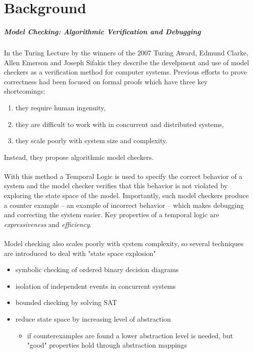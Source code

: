 \documentclass{uit-thesis}
\begin{document}
\chapter{Background}\label{ch:background}
\paragraph{Model Checking: Algorithmic Verification and Debugging~\cite{Clarke2009}}
In the Turing Lecture by the winners of the 2007 Turing Award, Edmund Clarke, Allen Emerson and Joseph Sifakis they describe the develpment and use of model checkers as a verification method for computer systems. Previous efforts to prove correctness had been focused on formal proofs which have three key shortcomings:
\begin{enumerate}
    \item they require human ingenuity,
    \item they are difficult to work with in concurrent and distributed systems,
    \item they scale poorly with system size and complexity.
\end{enumerate}
Instead, they propose algorithmic model checkers.
\\\\
With this method a Temporal Logic is used to specify the correct behavior of a system and the model checker verifies that this behavior is not violated by exploring the state space of the model. Importantly, such model checkers produce a counter example -- an example of incorrect behavior -- which makes debugging and correcting the system easier.
Key properties of a temporal logic are \textit{expressiveness} and \textit{efficiency}.
\\\\
Model checking also scales poorly with system complexity, so several techniques are introduced to deal with "state space explosion"
\begin{itemize}
    \item symbolic checking of ordered binary decision diagrams
    \item isolation of independent events in concurrent systems
    \item bounded checking by solving SAT
    \item reduce state space by increasing level of abstraction
    \begin{itemize}
        \item if counterexamples are found a lower abstraction level is needed, but "good" properties hold through abstraction mappings
    \end{itemize}
\end{itemize}
\end{document}
